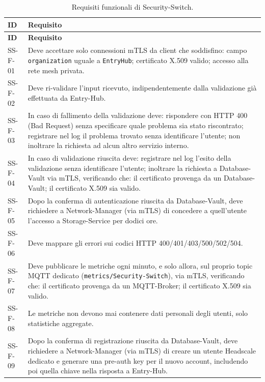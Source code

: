 \begin{longtable}{p{2.6cm} p{\dimexpr\linewidth-2.6cm-4\tabcolsep\relax}}
\caption{Requisiti funzionali di Security-Switch.} \\
\hline
\textbf{ID} & \textbf{Requisito} \\
\hline
\endfirsthead
\hline
\textbf{ID} & \textbf{Requisito} \\
\hline
\endhead
\hline
\endfoot
\hline
\endlastfoot
SS-F-01 & Deve accettare solo connessioni mTLS da client che soddisfino: campo \texttt{organization} uguale a \texttt{EntryHub}; certificato X.509 valido; accesso alla rete mesh privata. \\
SS-F-02 & Deve ri-validare l'input ricevuto, indipendentemente dalla validazione già effettuata da Entry-Hub. \\
SS-F-03 & In caso di fallimento della validazione deve: rispondere con HTTP 400 (Bad Request) senza specificare quale problema sia stato riscontrato; registrare nel log il problema trovato senza identificare l'utente; non inoltrare la richiesta ad alcun altro servizio interno. \\
SS-F-04 & In caso di validazione riuscita deve: registrare nel log l'esito della validazione senza identificare l'utente; inoltrare la richiesta a Database-Vault via mTLS, verificando che: il certificato provenga da un Database-Vault; il certificato X.509 sia valido. \\
SS-F-05 & Dopo la conferma di autenticazione riuscita da Database-Vault, deve richiedere a Network-Manager (via mTLS) di concedere a quell'utente l'accesso a Storage-Service per dodici ore. \\
SS-F-06 & Deve mappare gli errori sui codici HTTP 400/401/403/500/502/504. \\
SS-F-07 & Deve pubblicare le metriche ogni minuto, e solo allora, sul proprio topic MQTT dedicato (\texttt{metrics/Security-Switch}), via mTLS, verificando che: il certificato provenga da un MQTT-Broker; il certificato X.509 sia valido. \\
SS-F-08 & Le metriche non devono mai contenere dati personali degli utenti, solo statistiche aggregate. \\
SS-F-09 & Dopo la conferma di registrazione riuscita da Database-Vault, deve richiedere a Network-Manager (via mTLS) di creare un utente Headscale dedicato e generare una pre-auth key per il nuovo account, includendo poi quella chiave nella risposta a Entry-Hub. \\
\end{longtable}

